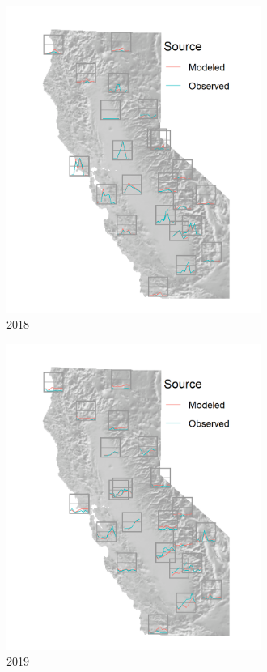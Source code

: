 \documentclass[gmd, manuscript]{copernicus}
\begin{document}
\begin{figure}
\includegraphics[width=8.3cm]{./Figures/Spark2018_GMD} \caption{2018}\label{fig:unnamed-chunk-3}
\end{figure}

\begin{figure}
\includegraphics[width=8.3cm]{./Figures/Spark2019_GMD} \caption{2019}\label{fig:unnamed-chunk-4}
\end{figure}
\end{document}
